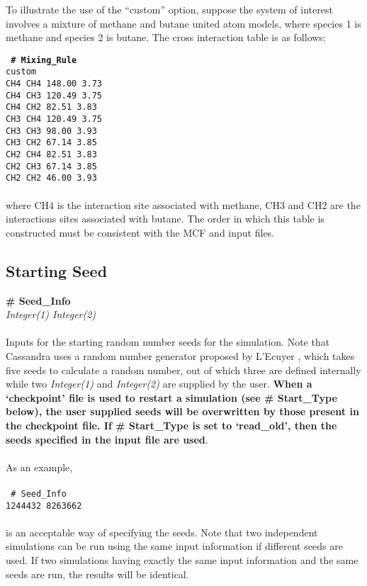 To illustrate the use of the ``custom'' option, suppose
the system of interest involves a mixture of methane and butane united atom
models, where species 1 is methane and species 2 is butane. The cross
interaction table is as follows:

\texttt{
{\bf \# Mixing\_Rule} \\
custom\\
CH4  CH4  148.00   3.73\\
CH4  CH3  120.49   3.75\\
CH4  CH2   82.51   3.83\\
CH3  CH4  120.49   3.75\\
CH3  CH3   98.00   3.93\\
CH3  CH2   67.14   3.85\\
CH2  CH4   82.51   3.83\\
CH2  CH3   67.14   3.85\\
CH2  CH2   46.00   3.93
}
\\ \\
where CH4 is the interaction site associated with methane, CH3 and CH2 are
the interactions sites associated with butane. The order in which
this table is constructed must be consistent with the MCF and input files.



%
%
\subsection{Starting Seed}\label{sec:Seed_Info}
{\bf \# Seed\_Info} \\ 
{\it Integer(1) Integer(2)} \\ \\
%
Inputs for the starting random number seeds for the simulation. Note
that Cassandra uses a random  number generator proposed by L'Ecuyer
\cite{random_gen:1999}, which takes five  
seeds to calculate a random number, out of which three are 
defined internally while two {\it Integer(1)} and {\it Integer(2)} are
supplied by the user. {\bf When a `checkpoint' file is used to restart a
simulation (see \# Start\_Type below), the user supplied seeds will be
overwritten by those present in the checkpoint file. If \# Start\_Type
is set to `read\_old', then the seeds specified in the input file are
used}.  \\ \\
As an example, \\ \\ 
\texttt{
\# Seed\_Info \\
1244432 8263662
} \\ \\
is an acceptable way of specifying the seeds. Note that two independent
simulations can be run using the same input information if different
seeds are used. If two simulations having exactly the same input
information and the same seeds are run, the results will be
identical. 
%
%
%
